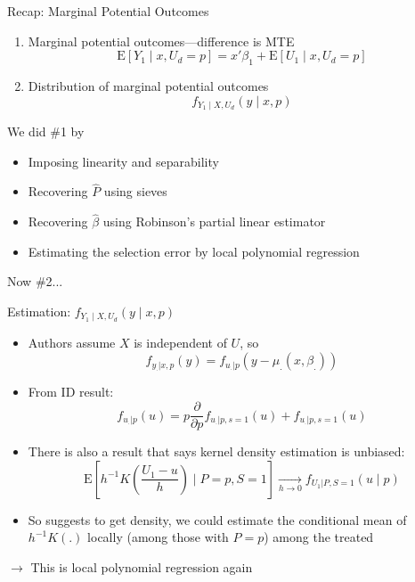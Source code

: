 \documentclass{beamer}
\begin{document}
\begin{frame}{Recap:  Marginal Potential Outcomes}
\begin{enumerate}
\item Marginal potential outcomes---difference is MTE
\begin{equation*}
  \mathrm{E}[Y_1\mid x,U_d=p] = x'\beta_1 +
  \mathrm{E}[U_1\mid x,U_d=p]
\end{equation*}
\item Distribution of marginal potential outcomes
  \begin{equation*}
    f_{Y_1\mid X,U_d}(y\mid x,p)
  \end{equation*}
\end{enumerate}

We did \#1 by
\begin{itemize}
\item Imposing linearity and separability
\item Recovering $\hat{P}$ using sieves
\item Recovering $\hat{\beta}$ using Robinson's partial linear
  estimator
\item Estimating the selection error by local polynomial regression
\end{itemize}
Now \#2...

\end{frame}

\begin{frame}{Estimation: $f_{Y_1\mid X,U_d}(y\mid x,p)$}
  \begin{itemize}
\item Authors assume $X$ is independent of $U$, so
\begin{equation*}
  f_{y_.|x,p}(y) = f_{u_.|p}(y-\mu_.(x,\beta_.))
\end{equation*}

\item From ID result:
  \begin{equation*}
    f_{u_.|p}(u) = p \frac{\partial}{\partial
    p}f_{u_.|p,s=1}(u) + f_{u_.|p,s=1}(u)
  \end{equation*}
\item There is also a result that says kernel density estimation is
  unbiased:
  \begin{equation*}
    \mathrm{E}\left[h^{-1}K\left(\frac{U_1-u}{h}\right)\mid P=p,
      S=1\right]\xrightarrow[h \rightarrow 0]{} f_{U_1|P,S=1}(u\mid p)
  \end{equation*}
\item So suggests to get density, we could estimate the conditional mean of
  $h^{-1}K(.)$ locally (among those with $P=p$) among the treated
  \end{itemize}
 $\rightarrow$ This is local polynomial regression again


\end{frame}
\end{document}
